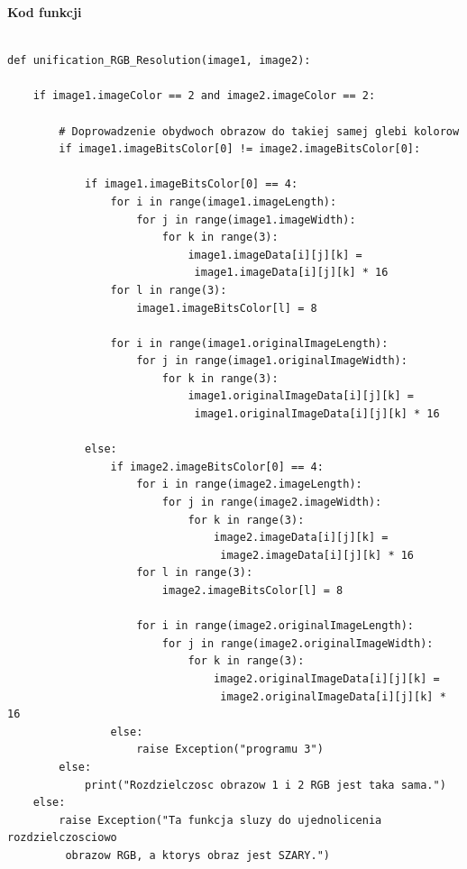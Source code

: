 \documentclass[magisterska,openany]{pracadypl}
\begin{document}
\newpage
\textbf{\Large Kod funkcji}
   
\lstset{language=Python}
\vspace{0.25cm}
\begin{lstlisting}[caption={Rozdzielczościowe ujednolicanie obrazów RGB}]

def unification_RGB_Resolution(image1, image2):

    if image1.imageColor == 2 and image2.imageColor == 2:

        # Doprowadzenie obydwoch obrazow do takiej samej glebi kolorow
        if image1.imageBitsColor[0] != image2.imageBitsColor[0]:

            if image1.imageBitsColor[0] == 4:
                for i in range(image1.imageLength):
                    for j in range(image1.imageWidth):
                        for k in range(3):
                            image1.imageData[i][j][k] =
                             image1.imageData[i][j][k] * 16
                for l in range(3):
                    image1.imageBitsColor[l] = 8

                for i in range(image1.originalImageLength):
                    for j in range(image1.originalImageWidth):
                        for k in range(3):
                            image1.originalImageData[i][j][k] =
                             image1.originalImageData[i][j][k] * 16

            else:
                if image2.imageBitsColor[0] == 4:
                    for i in range(image2.imageLength):
                        for j in range(image2.imageWidth):
                            for k in range(3):
                                image2.imageData[i][j][k] =
                                 image2.imageData[i][j][k] * 16
                    for l in range(3):
                        image2.imageBitsColor[l] = 8

                    for i in range(image2.originalImageLength):
                        for j in range(image2.originalImageWidth):
                            for k in range(3):
                                image2.originalImageData[i][j][k] =
                                 image2.originalImageData[i][j][k] * 16
                else:
                    raise Exception("programu 3")
        else:
            print("Rozdzielczosc obrazow 1 i 2 RGB jest taka sama.")
    else:
        raise Exception("Ta funkcja sluzy do ujednolicenia rozdzielczosciowo
         obrazow RGB, a ktorys obraz jest SZARY.")

\end{lstlisting}
\end{document}
